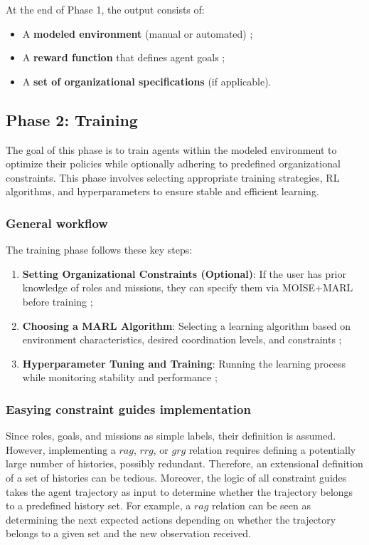 \documentclass[pdflatex,sn-mathphys-num]{sn-jnl}%
\theoremstyle{thmstyleone}%
\theoremstyle{thmstyletwo}%
\theoremstyle{thmstylethree}%
\begin{document}
At the end of Phase 1, the output consists of:
\begin{itemize}
    \item A \textbf{modeled environment} (manual or automated) ;
    \item A \textbf{reward function} that defines agent goals ;
    \item A \textbf{set of organizational specifications} (if applicable).
\end{itemize}

\subsection{Phase 2: Training}

The goal of this phase is to train agents within the modeled environment to optimize their policies while optionally adhering to predefined organizational constraints. This phase involves selecting appropriate training strategies, RL algorithms, and hyperparameters to ensure stable and efficient learning.

\subsubsection{General workflow}
The training phase follows these key steps:
\begin{enumerate}
    \item \textbf{Setting Organizational Constraints (Optional)}: If the user has prior knowledge of roles and missions, they can specify them via MOISE+MARL before training ;
    \item \textbf{Choosing a MARL Algorithm}: Selecting a learning algorithm based on environment characteristics, desired coordination levels, and constraints ;
    \item \textbf{Hyperparameter Tuning and Training}: Running the learning process while monitoring stability and performance ;
\end{enumerate}

\subsubsection{Easying constraint guides implementation}

Since roles, goals, and missions as simple labels, their definition is assumed. However, implementing a $rag$, $rrg$, or $grg$ relation requires defining a potentially large number of histories, possibly redundant. Therefore, an extensional definition of a set of histories can be tedious. Moreover, the logic of all constraint guides takes the agent trajectory as input to determine whether the trajectory belongs to a predefined history set. For example, a $rag$ relation can be seen as determining the next expected actions depending on whether the trajectory belongs to a given set and the new observation received.
\end{document}
